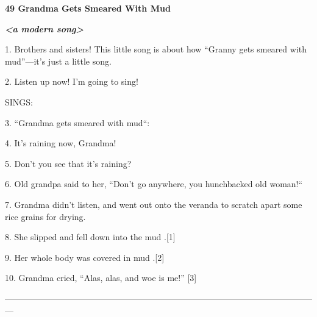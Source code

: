 
{\LARGE{}\textbf{49 Grandma Gets Smeared With Mud }}

{\LARGE{}\textit{\textbf{<a modern song>}}}

{\LARGE{}1. Brothers and sisters!  This little song is about how ``Granny gets
smeared with mud''---it's just a little song.}

{\LARGE{}2. Listen up now!  I'm going to sing!}

{\LARGE{}SINGS: }

{\LARGE{}3. ``Grandma gets smeared with mud``:}

{\LARGE{}4. It's raining now, Grandma!}

{\LARGE{}5. Don't you see that it's raining?}

{\LARGE{}6. Old grandpa said to her, ``Don't go anywhere, you hunchbacked old woman!``
}

{\LARGE{}7. Grandma didn't listen, and went out onto the veranda to scratch apart
some rice grains for drying.}

{\LARGE{}8. She slipped and fell down into the mud .[1]}

{\LARGE{}9. Her whole body was covered in mud .[2]}

{\LARGE{}10. Grandma cried, ``Alas, alas, and woe is me!'' [3]}

{\LARGE{}---------------------------------------------------------------------------------------------------------------}

